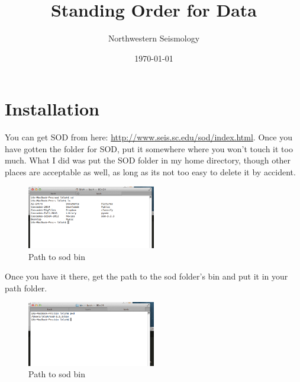 \documentclass[letterpaper,10pt]{article}
\title{Standing Order for Data}
\author{Northwestern Seismology}
\date{\today}
\begin{document}
\maketitle



\section{Installation}

You can get SOD from here: \url{http://www.seis.sc.edu/sod/index.html}.
Once you have gotten the folder for SOD, put it somewhere where you won't touch it too much. What I did was put the SOD folder in my home directory, though other places are acceptable as well, as long as its not too easy to delete it by accident.

\begin{figure}[h!]
  \centering
  \includegraphics[width=0.5\textwidth]{images/sod_location}
  \caption{Path to sod bin}
  \label{fig:sod_location}
\end{figure}

Once you have it there, get the path to the sod folder's bin and put it in your path folder. 


\begin{figure}[h!]
  \centering
  \includegraphics[width=0.5\textwidth]{images/path_to_sod_bin}
  \caption{Path to sod bin}
  \label{fig:path_to_sod_bin}
\end{figure}
\end{document}

